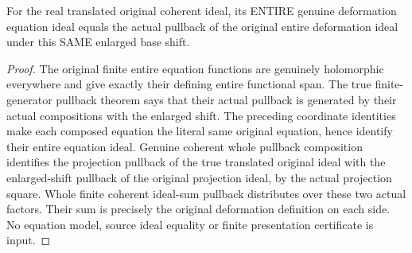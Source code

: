 \begin{lemma}
\label{hir:relative-normal-affine-dnc-equation-ideal}
\leanok
For the real translated original coherent ideal, its ENTIRE genuine deformation equation ideal equals the actual pullback of the original entire deformation ideal under this SAME enlarged base shift.
\end{lemma}
\begin{proof}
The original finite entire equation functions are genuinely holomorphic everywhere and give exactly their defining entire functional span. The true finite-generator pullback theorem says that their actual pullback is generated by their actual compositions with the enlarged shift. The preceding coordinate identities make each composed equation the literal same original equation, hence identify their entire equation ideal. Genuine coherent whole pullback composition identifies the projection pullback of the true translated original ideal with the enlarged-shift pullback of the original projection ideal, by the actual projection square. Whole finite coherent ideal-sum pullback distributes over these two actual factors. Their sum is precisely the original deformation definition on each side. No equation model, source ideal equality or finite presentation certificate is input.
\end{proof}

